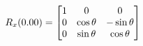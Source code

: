 \documentclass[preview]{standalone}
\begin{document}
\begin{align*}
\special{dvisvgm:raw <g id='unique000'>}R_{x}(0.00) = \begin{bmatrix} 1 & 0 & 0 \\ 0 & \cos\theta & -\sin\theta \\ 0 & \sin\theta & \cos\theta \end{bmatrix}\special{dvisvgm:raw </g>}
\end{align*}
\end{document}
